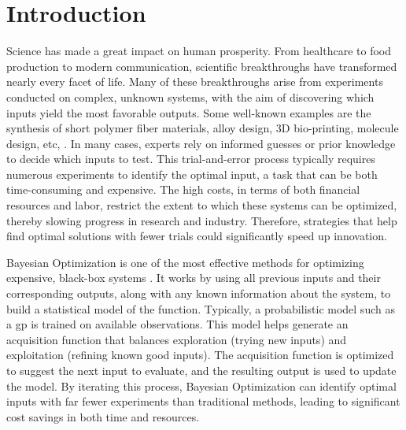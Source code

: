 \chapter{Introduction} %

\label{chap:introduction} %


\newcommand{\keyword}[1]{\textbf{#1}}
\newcommand{\tabhead}[1]{\textbf{#1}}
\newcommand{\code}[1]{\texttt{#1}}
\newcommand{\file}[1]{\texttt{\bfseries#1}}
\newcommand{\option}[1]{\texttt{\itshape#1}}

Science has made a great impact on human prosperity. From healthcare to food production to modern communication, scientific breakthroughs have transformed nearly every facet of life. Many of these breakthroughs arise from experiments conducted on complex, unknown systems, with the aim of discovering which inputs yield the most favorable outputs. Some well-known examples are the synthesis of short polymer fiber materials, alloy design, 3D bio-printing, molecule design, etc, \citep{greenhill2020bayesian, shahriari2015taking}. In many cases, experts rely on informed guesses or prior knowledge to decide which inputs to test. This trial-and-error process typically requires numerous experiments to identify the optimal input, a task that can be both time-consuming and expensive. The high costs, in terms of both financial resources and labor, restrict the extent to which these systems can be optimized, thereby slowing progress in research and industry. Therefore, strategies that help find optimal solutions with fewer trials could significantly speed up innovation.

Bayesian Optimization is one of the most effective methods for optimizing expensive, black-box systems \citep{mockus1978application, streltsov1999non}. It works by using all previous inputs and their corresponding outputs, along with any known information about the system, to build a statistical model of the function. Typically, a probabilistic model such as a \ac{gp} is trained on available observations. This model helps generate an acquisition function that balances exploration (trying new inputs) and exploitation (refining known good inputs). The acquisition function is optimized to suggest the next input to evaluate, and the resulting output is used to update the model. By iterating this process, Bayesian Optimization can identify optimal inputs with far fewer experiments than traditional methods, leading to significant cost savings in both time and resources. 

